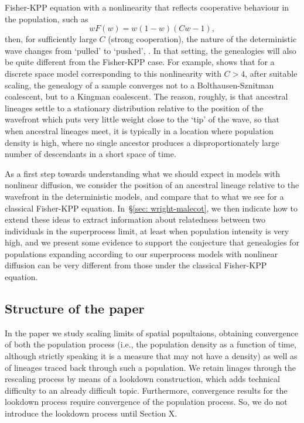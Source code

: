 \documentclass[12pt]{article}
\begin{document}
Fisher-KPP equation with a nonlinearity that reflects cooperative
behaviour in the population, such as
$$wF(w)=w(1-w)(Cw-1),$$
then, for sufficiently large $C$ (strong cooperation),
the nature of the deterministic
wave changes from `pulled' to `pushed', \cite{birzu/hallatschek/korolev:2017}.
In that setting, the genealogies will also be quite different
from the Fisher-KPP case. For example, \cite{etheridge/penington:2020}
shows that for a discrete space model corresponding to this 
nonlinearity with $C>4$, after suitable scaling, the genealogy of a
sample converges not to a Bolthausen-Sznitman coalescent, but to
a Kingman coalescent. 
The reason, roughly, is that ancestral lineages
settle to a stationary distribution relative to the position of the 
wavefront which puts very little weight close to the `tip' of the wave, so
that when ancestral lineages meet,
it is typically in a location where population density is
high, where no single ancestor produces a disproportionately large number of 
descendants in a short space of time. 

As a first step towards understanding what we should expect in models with
nonlinear diffusion, we consider the position of an ancestral lineage
relative to the wavefront in the deterministic models, and compare that 
to what we see for a classical Fisher-KPP equation. 
In~\S\ref{sec: wright-malecot}, we then indicate how to extend these ideas to 
extract information about relatedness between two individuals in the 
superprocess limit, at least when population intensity is very high, and
we present some evidence to support the conjecture that genealogies 
for populations expanding according to 
our superprocess models with nonlinear diffusion
can be very different from those under 
the classical Fisher-KPP equation. 

\subsection{Structure of the paper}

In the paper we study scaling limits of spatial popultaions,
obtaining convergence of both the population process
(i.e., the population density as a function of time,
although strictly speaking it is a measure that may not have a density)
as well as of lineages traced back through such a population.
We retain linages through the rescaling process
by means of a lookdown construction, which adds technical difficulty
to an already difficult topic.
Furthermore, convergence results for the lookdown process
require convergence of the population process.
So, we do not introduce the lookdown process until Section X.
\end{document}
